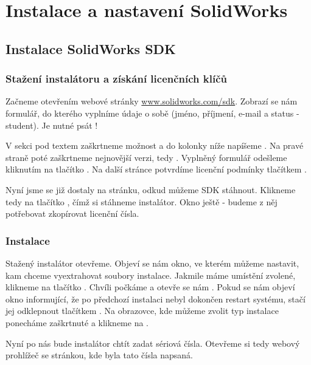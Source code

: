 \chapter{Instalace a nastavení SolidWorks}
\section{Instalace SolidWorks SDK}

\subsection{Stažení instalátoru a získání licenčních klíčů}
Začneme otevřením webové stránky \href{http://www.solidworks.com/sdk}{www.solidworks.com/sdk}.
Zobrazí se nám formulář, do kterého vyplníme údaje o sobě (jméno, příjmení, e-mail a status - student).
Je nutné psát !

\fxnote[author=PŠ]{\textcolor{mygreen}{Sem přijde screenshot formuláře}}

V sekci  pod textem  zaškrtneme možnost  a do kolonky níže napíšeme .
Na pravé straně poté zaškrtneme nejnovější verzi, tedy .
Vyplněný formulář odešleme kliknutím na tlačítko .
Na další stránce potvrdíme licenční podmínky tlačítkem .

Nyní jsme se již dostaly na stránku, odkud můžeme SDK stáhnout.
Klikneme tedy na tlačítko , čímž si stáhneme instalátor.
Okno ještě  - budeme z něj potřebovat zkopírovat licenční čísla. 

\subsection{Instalace}
Stažený instalátor otevřeme. 
Objeví se nám okno, ve kterém můžeme nastavit, kam chceme vyextrahovat soubory instalace.
Jakmile máme umístění zvolené, klikneme na tlačítko .
Chvíli počkáme a otevře se nám .
Pokud se nám objeví okno informující, že po předchozí instalaci nebyl dokončen restart systému, stačí jej odklepnout tlačítkem .
Na obrazovce, kde můžeme zvolit typ instalace ponecháme zaškrtnuté  a klikneme na .

Nyní po nás bude instalátor chtít zadat sériová čísla. 
Otevřeme si tedy webový prohlížeč se stránkou, kde byla tato čísla napsaná.

